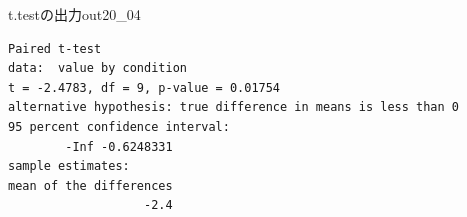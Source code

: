 \begin{Rscreen}{t.testの出力}{out20_04}
	\begin{verbatim}
Paired t-test
data:  value by condition
t = -2.4783, df = 9, p-value = 0.01754
alternative hypothesis: true difference in means is less than 0
95 percent confidence interval:
        -Inf -0.6248331
sample estimates:
mean of the differences 
                   -2.4 
\end{verbatim}
\end{Rscreen}
